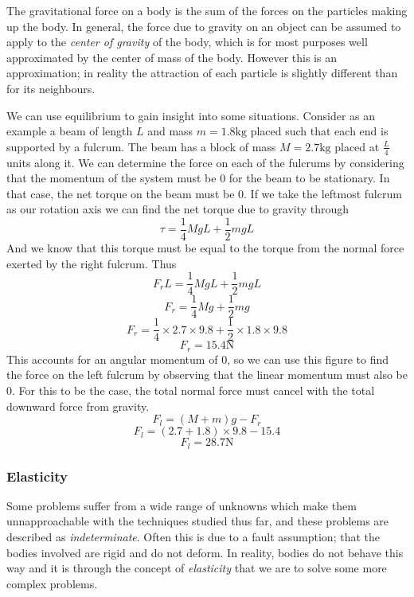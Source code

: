 \documentclass[12pt]{report}
\begin{document}
\begin{flushleft}
\bigskip
The gravitational force on a body is the sum of the forces on the particles
making up the body. In general, the force due to gravity on an object can be
assumed to apply to the \textit{center of gravity} of the body, which is for
most purposes well approximated by the center of mass of the body. However this
is an approximation; in reality the attraction of each particle is slightly 
different than for its neighbours.

\bigskip
We can use equilibrium to gain insight into some situations. Consider as an
example a beam of length \(L\) and mass \(m = 1.8\mathrm{kg}\) placed such 
that each end is supported by a fulcrum. The beam has a block of mass 
\(M = 2.7\mathrm{kg}\) placed at \(\frac{L}{4}\) units along it. We can 
determine the force on each of the fulcrums by considering that the momentum
of the system must be \(0\) for the beam to be stationary. In that case,
the net torque on the beam must be \(0\). If we take the leftmost fulcrum
as our rotation axis we can find the net torque due to gravity through
\[\tau = \frac{1}{4}MgL + \frac{1}{2}mgL\]
And we know that this torque must be equal to the torque from the normal force
exerted by the right fulcrum. Thus
\[F_rL = \frac{1}{4}MgL + \frac{1}{2}mgL\] 
\[F_r = \frac{1}{4}Mg + \frac{1}{2}mg\]
\[F_r = \frac{1}{4}\times2.7\times9.8 + \frac{1}{2}\times1.8\times9.8\]
\[F_r = 15.4\mathrm{N}\]
This accounts for an angular momentum of \(0\), so we can use this figure to
find the force on the left fulcrum by observing that the linear momentum must
also be \(0\). For this to be the case, the total normal force must cancel with
the total downward force from gravity.
\[F_l = (M + m)g - F_r\]
\[F_l = (2.7 + 1.8) \times 9.8 - 15.4\]
\[F_l = 28.7\mathrm{N}\]

\subsubsection*{Elasticity}
Some problems suffer from a wide range of unknowns which make them 
unnapproachable with the techniques studied thus far, and these problems are
described as \textit{indeterminate}. Often this is due to a fault assumption;
that the bodies involved are rigid and do not deform. In reality, bodies do not
behave this way and it is through the concept of \textit{elasticity} that we
are to solve some more complex problems.


\end{flushleft}
\end{document}
